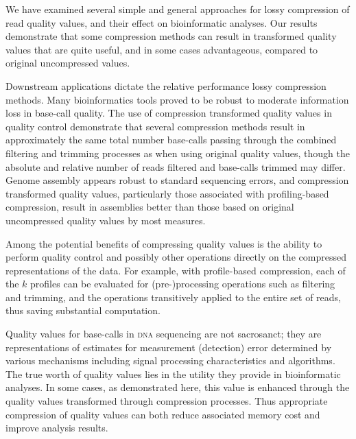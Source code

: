 \documentclass{bioinfo}
\begin{document}
We have examined several simple and general approaches for lossy
compression of read quality values, and their effect on bioinformatic
analyses. Our results demonstrate that some compression methods can
result in transformed quality values that are quite useful, and in
some cases advantageous, compared to original uncompressed values.

Downstream applications dictate the relative performance lossy
compression methods.  Many bioinformatics tools proved to be robust to
moderate information loss in base-call quality. The use of compression
transformed quality values in quality control demonstrate that several
compression methods result in approximately the same total number
base-calls passing through the combined filtering and trimming
processes as when using original quality values, though the absolute
and relative number of reads filtered and base-calls trimmed may
differ. Genome assembly appears robust to standard sequencing errors,
and compression transformed quality values, particularly those
associated with profiling-based compression, result in assemblies
better than those based on original uncompressed quality values by
most measures.

Among the potential benefits of compressing quality values is the
ability to perform quality control and possibly other operations
directly on the compressed representations of the data. For example,
with profile-based compression, each of the $k$ profiles can be
evaluated for (pre-)processing operations such as filtering and
trimming, and the operations transitively applied to the entire set of
reads, thus saving substantial computation.

%
%

Quality values for base-calls in \textsc{dna} sequencing are not
sacrosanct; they are representations of estimates for measurement
(detection) error determined by various mechanisms including signal
processing characteristics and algorithms. The true worth of quality
values lies in the utility they provide in bioinformatic analyses. In
some cases, as demonstrated here, this value is enhanced through the
quality values transformed through compression processes. Thus
appropriate compression of quality values can both reduce associated
memory cost and improve analysis results.
\end{document}
